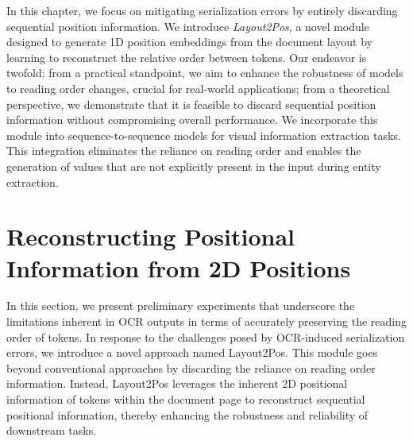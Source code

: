 
In this chapter, we focus on mitigating serialization errors by entirely discarding sequential position information. We introduce \textit{Layout2Pos}, a novel module designed to generate 1D position embeddings from the document layout by learning to reconstruct the relative order between tokens. Our endeavor is twofold: from a practical standpoint, we aim to enhance the robustness of models to reading order changes, crucial for real-world applications; from a theoretical perspective, we demonstrate that it is feasible to discard sequential position information without compromising overall performance. We incorporate this module into sequence-to-sequence models for visual information extraction tasks. This integration eliminates the reliance on reading order and enables the generation of values that are not explicitly present in the input during entity extraction.


\section{Reconstructing Positional Information from 2D Positions}

In this section, we present preliminary experiments that underscore the limitations inherent in OCR outputs in terms of accurately preserving the reading order of tokens. In response to the challenges posed by OCR-induced serialization errors, we introduce a novel approach named Layout2Pos. This module goes beyond conventional approaches by discarding the reliance on reading order information. Instead, Layout2Pos leverages the inherent 2D positional information of tokens within the document page to reconstruct sequential positional information, thereby enhancing the robustness and reliability of downstream tasks.

